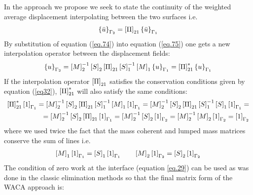 In the approach we propose we seek to state the continuity of the weighted average displacement interpolating between the two surfaces i.e.
\begin{equation}
\label{eq.75}
\left\lbrace{\bar{u}}\right \rbrace_{\Gamma_2}=\left[{\Pi}\right]_{21}\left\lbrace{\bar{u}}\right \rbrace_{\Gamma_1}
\end{equation}
By substitution of equation (\ref{eq.74})  into equation  (\ref{eq.75}) one gets a new interpolation operator between the displacement fields:
\begin{equation}
\label{eq.76}
\left\lbrace{u}\right \rbrace_{\Gamma_2}=\left[{M}\right]_{2}^{-1}\left[{S}\right]_2\left[{\Pi}\right]_{21}\left[{S}\right]_1^{-1}\left[{M}\right]_{1}\left\lbrace{u}\right \rbrace_{\Gamma_1}=\left[{\Pi}\right]_{21}^{*}\left\lbrace{u}\right \rbrace_{\Gamma_1}
\end{equation}
If the interpolation operator $\left[{\Pi}\right]_{21}$ satisfies the conservation conditions given by equation (\ref{eq32}), $\left[{\Pi}\right]^{*}_{21}$ will also satisfy the same conditions:
\begin{equation}
\label{eq.77}
\begin{aligned}
\left[{\Pi}\right]_{21}^{*}\left[{1}\right]_{\Gamma_1}=\left[{M}\right]_{2}^{-1}\left[{S}\right]_2\left[{\Pi}\right]_{21}\left[{S}\right]_1^{-1}\left[{M}\right]_{1}\left[{1}\right]_{\Gamma_1}=\left[{M}\right]_{2}^{-1}\left[{S}\right]_2\left[{\Pi}\right]_{21}\left[{S}\right]_1^{-1}\left[{S}\right]_1\left[{1}\right]_{\Gamma_1}=\\=
\left[{M}\right]_{2}^{-1}\left[{S}\right]_2\left[{\Pi}\right]_{21}\left[{1}\right]_{\Gamma_1}=\left[{M}\right]_{2}^{-1}\left[{S}\right]_2\left[{1}\right]_{\Gamma_2}=\left[{M}\right]_{2}^{-1}\left[{M}\right]_{2}\left[{1}\right]_{\Gamma_2}=\left[{1}\right]_{\Gamma_2}
\end{aligned}
\end{equation}
where we used twice the fact that the mass coherent and lumped mass matrices conserve the sum of lines i.e.
\begin{eqnarray}
\label{eq.78}
\left[{M}\right]_{1}\left[{1}\right]_{\Gamma_1}=\left[{S}\right]_{1}\left[{1}\right]_{\Gamma_1} \qquad \left[{M}\right]_{2}\left[{1}\right]_{\Gamma_2}=\left[{S}\right]_{2}\left[{1}\right]_{\Gamma_2} 
\end{eqnarray}
The condition of zero work at the interface (equation \ref{eq.29}) can be used as was done in the classic elimination methods so that the final matrix form of the WACA approach is:
